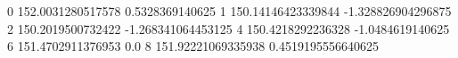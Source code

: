 0 152.0031280517578 0.5328369140625
1 150.14146423339844 -1.328826904296875
2 150.2019500732422 -1.268341064453125
4 150.4218292236328 -1.0484619140625
6 151.4702911376953 0.0
8 151.92221069335938 0.4519195556640625
